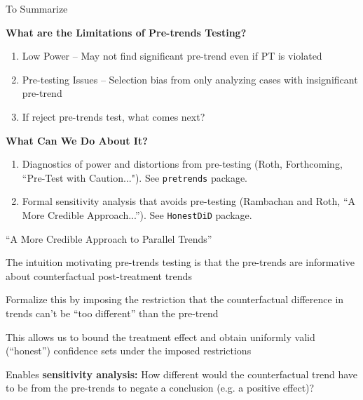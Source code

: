 \documentclass[aspectratio = 169, 13pt]{beamer}
\begin{document}
\begin{frame}{To Summarize}
	
	\textbf{What are the Limitations of Pre-trends Testing?}
	\begin{enumerate}
		\item
		      Low Power -- May not find significant pre-trend even if PT is violated
		          
		\item
		      Pre-testing Issues -- Selection bias from only analyzing cases with insignificant pre-trend
		          
		\item
		      If reject pre-trends test, what comes next? 
	\end{enumerate}
	
	\bigskip
	\pause 
	
	\textbf{What Can We Do About It?}
	\begin{enumerate}
		\item 
		      Diagnostics of power and distortions from pre-testing (Roth, Forthcoming, ``Pre-Test with Caution..."). See \texttt{pretrends} package. \hyperlink{power_analysis}{}
		          
		\item
		      Formal sensitivity analysis that avoids pre-testing (Rambachan and Roth, ``A More Credible Approach...''). See \texttt{HonestDiD} package.
		          
	\end{enumerate}
	
\end{frame}




\begin{frame}{``A More Credible Approach to Parallel Trends''}
	\begin{wideitemize}
		
		
		\item The intuition motivating pre-trends testing is that the pre-trends are informative about counterfactual post-treatment trends
		
		\item Formalize this by imposing the restriction that the counterfactual difference in trends can't be ``too different'' than the pre-trend
		
		
		\item This allows us to bound the treatment effect and obtain uniformly valid (``honest'') confidence sets under the imposed restrictions
		    
		    
		\item Enables \textbf{sensitivity analysis:} How different would the counterfactual trend have to be from the pre-trends to negate a conclusion (e.g. a positive effect)?
		    
	\end{wideitemize}
	
\end{frame}
\end{document}
